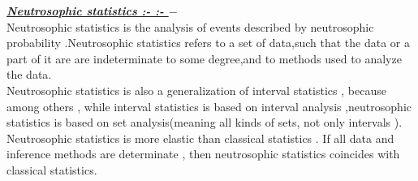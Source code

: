 \documentclass[12pt,a4paper,oneside]{article}
\begin{document}
\textrm{\textit{\textbf{\underline{Neutrosophic statistics :- :- $-$}}}}\\
Neutrosophic statistics is the analysis of events described  by neutrosophic probability .Neutrosophic statistics refers to a set of data,such that the data or a part of it are are indeterminate to some degree,and to methods used to analyze the data. \\
Neutrosophic statistics is  also  a generalization of  interval statistics , because among others , while interval statistics is based on interval analysis ,neutrosophic statistics is based on set analysis(meaning all kinds of sets, not only intervals ).\\
Neutrosophic statistics is more elastic than classical statistics . If all data and inference  methods are determinate , then neutrosophic  statistics coincides with classical statistics.
\end{document}
